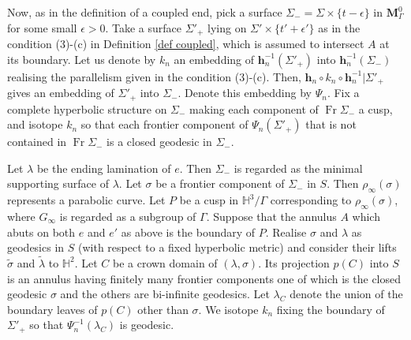 \documentclass{amsart}
\theoremstyle{definition}
\newcommand{\Fr}{\operatorname{Fr}}
\newcommand\HHH{{\mathbb H}}
\begin{document}
Now, as in the definition of a coupled end, pick a surface $\Sigma_-=\Sigma \times \{t-\epsilon\}$ in $\mathbf M_\Gamma^0$ for some small $\epsilon>0$. 
Take a surface $\Sigma'_+$ lying on $\Sigma' \times \{t'+\epsilon'\}$ as in the condition (3)-(c) in Definition \ref{def coupled}, which is assumed to intersect $A$ at its boundary.
Let us denote by $k_n$ an embedding of   $\mathbf h_n^{-1}(\Sigma'_+)$ into $\mathbf h_n^{-1}(\Sigma_-)$ realising the parallelism given in the condition (3)-(c).
Then,  $\mathbf h_n \circ k_n \circ \mathbf h_n^{-1}|\Sigma'_+$ gives an embedding of $\Sigma'_+$ into $\Sigma_-$. Denote this embedding by $\Psi_n$.  
Fix a complete hyperbolic structure on $\Sigma_-$ making each component of $\Fr \Sigma_-$ a cusp, and 
isotope $k_n$ so that each frontier component of $\Psi_n(\Sigma'_+)$ that is not contained in $\Fr 
\Sigma_-$ is a closed geodesic in $\Sigma_-$.


Let $\lambda$ be the ending lamination of $e$.
Then $\Sigma_-$ is regarded as the minimal supporting surface of $\lambda$.
Let $\sigma$ be a frontier component of $\Sigma_-$ in $S$.
Then $\rho_\infty(\sigma)$ represents a parabolic curve.
Let $P$ be a cusp in $\HHH^3/\Gamma$ corresponding to $\rho_\infty(\sigma)$, where $G_\infty$ is regarded as a subgroup of $\Gamma$.
Suppose that the annulus $A$ which abuts on both $e$ and $e'$ as above is the boundary of $P$.
Realise $\sigma$ and $\lambda$ as geodesics in $S$  (with respect to a fixed hyperbolic metric) and consider their lifts $\tilde \sigma$ and $\tilde \lambda$ to $\HHH^2$.
Let $C$ be a crown domain of $(\lambda, \sigma)$.
Its projection $p(C)$ into $S$ is an  annulus having finitely many frontier components one of which is the closed geodesic $\sigma$ and the others are bi-infinite geodesics.
Let $\lambda_C$ denote the union of the boundary leaves of $p(C)$ other than $\sigma$. 
We isotope $k_n$ fixing the boundary of $\Sigma'_+$ so that $\Psi^{-1}_n(\lambda_C)$ is geodesic.
\end{document}
